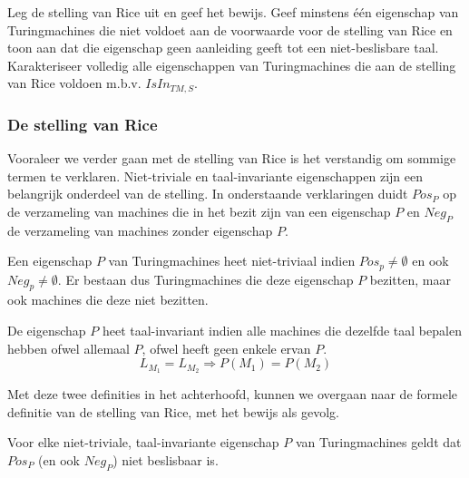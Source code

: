 \begin{quest}
	Leg de stelling van Rice uit en geef het bewijs. Geef minstens \'e\'en eigenschap van Turingmachines die niet voldoet aan de voorwaarde voor de stelling van Rice en toon aan dat die eigenschap geen aanleiding geeft tot een niet-beslisbare taal. Karakteriseer volledig alle eigenschappen van Turingmachines die aan de stelling van Rice voldoen m.b.v. $IsIn_{TM,S}$.
\end{quest}

\subsubsection*{De stelling van Rice}

Vooraleer we verder gaan met de stelling van Rice is het verstandig om sommige termen te verklaren. Niet-triviale en taal-invariante eigenschappen zijn een belangrijk onderdeel van de stelling. In onderstaande verklaringen duidt $Pos_P$ op de verzameling van machines die in het bezit zijn van een eigenschap $P$ en $Neg_P$ de verzameling van machines zonder eigenschap $P$.

\begin{theorem}
	Een eigenschap $P$ van Turingmachines heet niet-triviaal indien $Pos_p \neq \emptyset$ en ook $Neg_p \neq \emptyset$. Er bestaan dus Turingmachines die deze eigenschap $P$ bezitten, maar ook machines die deze niet bezitten.
\end{theorem}

\begin{theorem} 
	De eigenschap $P$ heet taal-invariant indien alle machines die dezelfde taal bepalen hebben ofwel allemaal $P$, ofwel heeft geen enkele ervan $P$.
	$$L_{M_1} = L_{M_2} \Rightarrow P(M_1) = P(M_2)$$
\end{theorem}

\noindent Met deze twee definities in het achterhoofd, kunnen we overgaan naar de formele definitie van de stelling van Rice, met het bewijs als gevolg.

\begin{theorem}
	Voor elke niet-triviale, taal-invariante eigenschap $P$ van Turingmachines geldt dat $Pos_P$ (en ook $Neg_P$) niet beslisbaar is.
\end{theorem}

